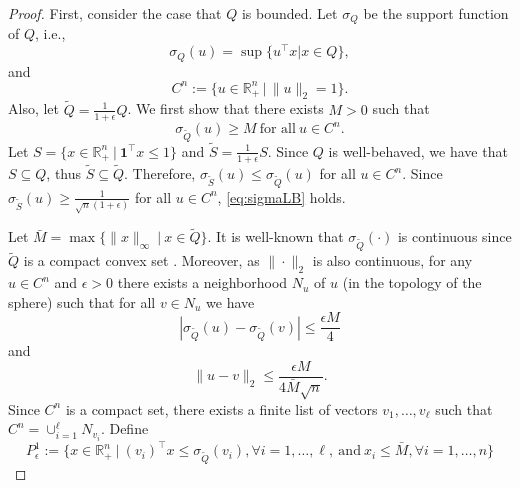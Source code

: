 \documentclass[11pt]{article}
\newcommand{\R}{\mathbb{R}}
\newcommand{\ones}{\boldsymbol{1}}
\newcommand{\cred}{\color{black}}
\begin{document}
\begin{proof}
{\cred First, consider the case that $Q$ is bounded.}  Let $\sigma_Q$ be the support function of $Q$, i.e.,
$$\sigma_Q (u) = \sup \{ u^\top x | x \in Q \},$$ 
and 
$$C^n := \{ u \in \R^n_+ \, | \, \|u\|_2 = 1 \}.$$
Also, let $\tilde{Q} = \frac{1}{1+\epsilon} Q$. We first show that there exists $M > 0$ such that 
\begin{equation}
\label{eq:sigmaLB}
\sigma_{\tilde{Q}}(u) \geq M \ \text{for all} \ u \in C^n.
\end{equation}
Let $S = \{ x \in \R^n_+ ~|~ \ones^\top x \leq 1 \}$ and $\tilde{S} = \frac{1}{1+\epsilon} S$. Since $Q$ is well-behaved, we have that $S \subseteq Q$, thus $\tilde{S} \subseteq \tilde{Q}$. Therefore, $\sigma_{\tilde{S}}(u) \leq \sigma_{\tilde{Q}}(u)$ for all $u \in C^n$. Since {\cred $\sigma_{\tilde{S}}(u) \geq \frac{1}{\sqrt{n}(1+\epsilon)}$} for all $u \in C^n$, \eqref{eq:sigmaLB} holds.

Let $\bar{M} = \max \{ \|x\|_\infty ~|~ x \in \tilde{Q} \}$. It is well-known that $\sigma_{\tilde{Q}} (\cdot)$ is continuous since $\tilde{Q}$ is a compact convex set \cite{rockafellar:1970}. Moreover, as $\|\cdot\|_2$ is also continuous, {\cred for any $u \in C^n$ and $\epsilon > 0$ there exists a neighborhood $N_u$ of $u$ (in the topology of the sphere)} such that for all $v \in N_u$ we have 
{\cred
\begin{equation}
\label{eq:contsigma}
|\sigma_{\tilde{Q}}(u) - \sigma_{\tilde{Q}}(v)| \le \frac{\epsilon M}{4}
\end{equation}
}
and
\begin{equation}
\label{eq:cont2norm}
\| u - v\|_2 \leq \frac{\epsilon M}{4 \bar{M}\sqrt{n}}.
\end{equation}
Since $C^n$ is a compact set, there exists a finite list of vectors $v_1,\hdots,v_\ell $ such that $C^n = \cup_{i=1}^\ell N_{v_i}$. Define 
\begin{equation}
\label{eq:Psetdef}
P^1_\epsilon := \{ x \in \R^n_+ ~|~ (v_i)^\top x \leq \sigma_{\tilde{Q}}(v_i), \forall i=1,\hdots,\ell, \ \text{and} \ x_i \leq \bar{M}, \forall i=1,\hdots,n \}
\end{equation}


\end{proof}
\end{document}
